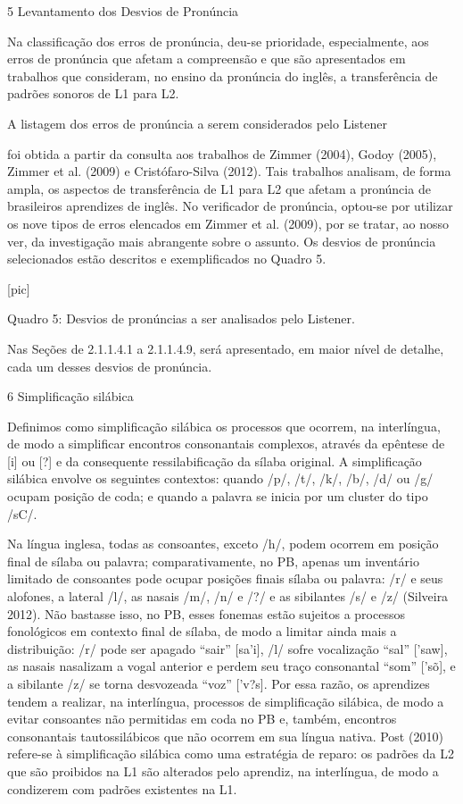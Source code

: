 5 Levantamento dos Desvios de Pron\'uncia

Na classifica\c{c}\~ao dos erros de pron\'uncia, deu-se prioridade,
especialmente, aos erros de pron\'uncia que afetam a compreens\~ao e que s\~ao
apresentados em trabalhos que consideram, no ensino da pron\'uncia do
ingl\^es, a transfer\^encia de padr\~oes sonoros de L1 para L2.

  A listagem dos erros de pron\'uncia a serem considerados  pelo  Listener

foi obtida a partir da consulta aos trabalhos de Zimmer (2004), Godoy
(2005), Zimmer et al. (2009) e Crist\'ofaro-Silva (2012). Tais trabalhos
analisam, de forma ampla, os aspectos de transfer\^encia de L1 para L2 que
afetam a pron\'uncia de brasileiros aprendizes de ingl\^es. No verificador
de pron\'uncia, optou-se por utilizar os nove tipos de erros elencados em
Zimmer et al. (2009), por se tratar, ao nosso ver, da investiga\c{c}\~ao mais
abrangente sobre o assunto. Os desvios de pron\'uncia selecionados est\~ao
descritos e exemplificados no Quadro 5.

{[}pic{]}

   Quadro 5: Desvios de pron\'uncias a ser analisados pelo Listener.

Nas Se\c{c}\~oes de 2.1.1.4.1 a 2.1.1.4.9, ser\'a apresentado, em maior n\'ivel de
detalhe, cada um desses desvios de pron\'uncia.

6 Simplifica\c{c}\~ao sil\'abica

Definimos como simplifica\c{c}\~ao sil\'abica os processos que ocorrem, na
interl\'ingua, de modo a simplificar encontros consonantais complexos,
atrav\'es da ep\^entese de {[}i{]} ou {[}?{]} e da consequente
ressilabifica\c{c}\~ao da s\'ilaba original. A simplifica\c{c}\~ao sil\'abica envolve os
seguintes contextos: quando /p/, /t/, /k/, /b/, /d/ ou /g/ ocupam
posi\c{c}\~ao de coda; e quando a palavra se inicia por um cluster do tipo
/sC/.

Na l\'ingua inglesa, todas as consoantes, exceto /h/, podem ocorrem em
posi\c{c}\~ao final de s\'ilaba ou palavra; comparativamente, no PB, apenas um
invent\'ario limitado de consoantes pode ocupar posi\c{c}\~oes finais s\'ilaba ou
palavra: /r/ e seus alofones, a lateral /l/, as nasais /m/, /n/ e /?/ e
as sibilantes /s/ e /z/ (Silveira 2012). N\~ao bastasse isso, no PB, esses
fonemas est\~ao sujeitos a processos fonol\'ogicos em contexto final de
s\'ilaba, de modo a limitar ainda mais a distribui\c{c}\~ao: /r/ pode ser
apagado ``sair'' {[}sa'i{]}, /l/ sofre vocaliza\c{c}\~ao ``sal'' {[}'saw{]},
as nasais nasalizam a vogal anterior e perdem seu tra\c{c}o consonantal
``som'' {[}'s\~o{]}, e a sibilante /z/ se torna desvozeada ``voz''
{[}'v?s{]}. Por essa raz\~ao, os aprendizes tendem a realizar, na
interl\'ingua, processos de simplifica\c{c}\~ao sil\'abica, de modo a evitar
consoantes n\~ao permitidas em coda no PB e, tamb\'em, encontros
consonantais tautossil\'abicos que n\~ao ocorrem em sua l\'ingua nativa. Post
(2010) refere-se à simplifica\c{c}\~ao sil\'abica como uma estrat\'egia de reparo:
os padr\~oes da L2 que s\~ao proibidos na L1 s\~ao alterados pelo aprendiz, na
interl\'ingua, de modo a condizerem com padr\~oes existentes na L1.

